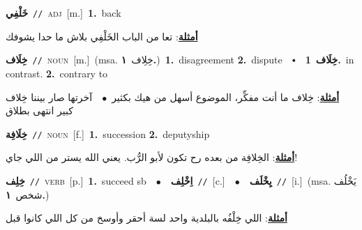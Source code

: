 \documentclass[10pt,a4paper,twoside]{article} %
\begin{document}
\begin{multicols}{2}
{\setlength\topsep{0pt}\textbf{\foreignlanguage{arabic}{خَلْفِي}}\ {\color{gray}\texttt{//}\color{black}}\ \textsc{adj}\ [m.]\ \textbf{1.}~back\  \begin{flushright}\color{gray}\foreignlanguage{arabic}{\textbf{\underline{\foreignlanguage{arabic}{أمثلة}}}: تعا من الباب الخَلْفِي بلاش ما حدا يشوفك}\end{flushright}\color{black}} \vspace{2mm}

{\setlength\topsep{0pt}\textbf{\foreignlanguage{arabic}{خِلَاف}}\ {\color{gray}\texttt{//}\color{black}}\ \textsc{noun}\ [m.]\ \color{gray}(msa. \foreignlanguage{arabic}{خِلِاف}~\foreignlanguage{arabic}{\textbf{١.}})\color{black}\ \textbf{1.}~disagreement  \textbf{2.}~dispute\ \ $\smblkdiamond$\ \ \setlength\topsep{0pt}\textbf{\foreignlanguage{arabic}{خِلَاف}}\ \textbf{1.}~in contrast.  \textbf{2.}~contrary to\  \begin{flushright}\color{gray}\foreignlanguage{arabic}{\textbf{\underline{\foreignlanguage{arabic}{أمثلة}}}: خِلاف ما أنت مفكِّر، الموضوع أسهل من هيك بكثير\ $\bullet$\ \  آخرتها صار بيننا خِلاف كبير انتهى بطلاق}\end{flushright}\color{black}} \vspace{2mm}

{\setlength\topsep{0pt}\textbf{\foreignlanguage{arabic}{خِلَافِة}}\ {\color{gray}\texttt{//}\color{black}}\ \textsc{noun}\ [f.]\ \textbf{1.}~succession  \textbf{2.}~deputyship\  \begin{flushright}\color{gray}\foreignlanguage{arabic}{\textbf{\underline{\foreignlanguage{arabic}{أمثلة}}}: الخِلافِة من بعده رح تكون لأبو الرُّب. يعني الله يستر من اللي جاي!}\end{flushright}\color{black}} \vspace{2mm}

{\setlength\topsep{0pt}\textbf{\foreignlanguage{arabic}{خِلِف}}\ {\color{gray}\texttt{//}\color{black}}\ \textsc{verb}\ [p.]\ \textbf{1.}~succeed sb\ \ $\bullet$\ \ \setlength\topsep{0pt}\textbf{\foreignlanguage{arabic}{اِخْلِف}}\ {\color{gray}\texttt{//}\color{black}}\ [c.]\ \ $\bullet$\ \ \setlength\topsep{0pt}\textbf{\foreignlanguage{arabic}{يِخْلَف}}\ {\color{gray}\texttt{//}\color{black}}\ [i.]\ \color{gray}(msa. \foreignlanguage{arabic}{يَخْلُف شخص}~\foreignlanguage{arabic}{\textbf{١.}})\color{black}\  \begin{flushright}\color{gray}\foreignlanguage{arabic}{\textbf{\underline{\foreignlanguage{arabic}{أمثلة}}}: اللي خِلْفُه بالبلدية واحد لسة أحقر وأوسخ من كل اللي كانوا قبل}\end{flushright}\color{black}} \vspace{2mm}


\end{multicols}
\end{document}
